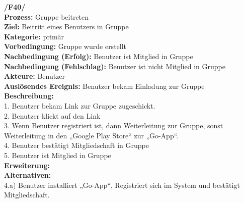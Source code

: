 \textbf{/F40/} \\
\textbf{Prozess:} Gruppe beitreten \\
\textbf{Ziel:} Beitritt eines Benutzers in Gruppe\\
\textbf{Kategorie:} primär \\
\textbf{Vorbedingung:} Gruppe wurde erstellt\\
\textbf{Nachbedingung (Erfolg):} Benutzer ist Mitglied in Gruppe\\
\textbf{Nachbedingung (Fehlschlag):} Benutzer ist nicht Mitglied in Gruppe\\
\textbf{Akteure:} Benutzer\\
\textbf{Auslösendes Ereignis:} Benutzer bekam Einladung zur Gruppe\\
\textbf{Beschreibung:} \\
1. Benutzer bekam Link zur Gruppe zugeschickt.\\
2. Benutzer klickt auf den Link \\
3. Wenn Benutzer registriert ist, dann Weiterleitung zur Gruppe, sonst Weiterleitung in den „Google Play Store“ zur „Go-App“.\\
4. Benutzer bestätigt Mitgliedschaft in Gruppe\\
5. Benutzer ist Mitglied in Gruppe\\
\textbf{Erweiterung:} \\
\textbf{Alternativen:} \\
4.a) Benutzer installiert „Go-App“, Registriert sich im System und bestätigt Mitgliedschaft.\\

